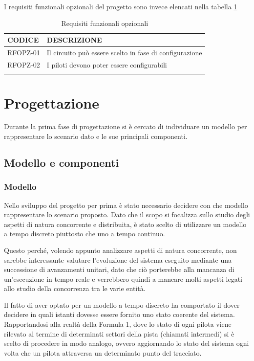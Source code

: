 \documentclass[a4paper,11pt, twoside]{book}
\begin{document}
    I requisiti funzionali opzionali del progetto sono invece elencati nella tabella \ref{tbl:RequisitiFunzionaliOpzionali}
    
    \begin{longtable}{|p{2cm}|p{8cm}|}
      \toprule
	\bfseries{CODICE} & \bfseries{DESCRIZIONE} \\\hline
      \endfirsthead
      RFOPZ-01 & Il circuito può essere scelto in fase di configurazione \\\cline{1-2}
      RFOPZ-02 & I piloti devono poter essere configurabili \\\cline{1-2}
      \caption{Requisiti funzionali opzionali}
      \label{tbl:RequisitiFunzionaliOpzionali}
    \end{longtable}
    
  
  \chapter{Progettazione}
    Durante la prima fase di progettazione si è cercato di individuare un modello per rappresentare
    lo scenario dato e le sue principali componenti.
    
    \section{Modello e componenti}
      \subsection{Modello}
      \label{Modello}
	Nello sviluppo del progetto 
	per prima è stato necessario decidere con che modello rappresentare lo scenario proposto. Dato che il scopo
        si focalizza sullo studio degli aspetti di natura concorrente e distribuita, è stato scelto di utilizzare un
	modello a tempo discreto piuttosto che uno a tempo continuo.
	
	Questo perché, volendo appunto analizzare aspetti di natura concorrente, non sarebbe interessante 
	valutare l'evoluzione del sistema eseguito mediante una successione di avanzamenti unitari, dato
	che ciò porterebbe alla mancanza di un'esecuzione in tempo reale e verrebbero quindi a mancare
	molti aspetti legati allo studio della concorrenza tra le varie entità.
	
	Il fatto di aver optato per un modello a tempo discreto ha comportato il dover decidere
	in quali istanti dovesse essere fornito uno stato coerente del sistema. Rapportandosi
	alla realtà della Formula 1, dove lo stato di ogni pilota viene rilevato al termine di determinati 
	settori della pista (chiamati intermedi)
	si è scelto di procedere in modo analogo, ovvero aggiornando lo stato del sistema ogni volta che
	un pilota attraversa un determinato punto del tracciato.
\end{document}
